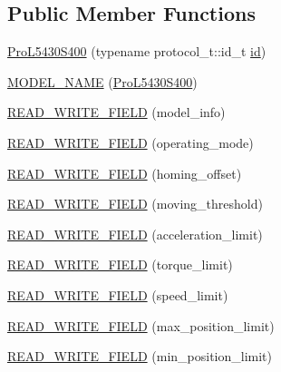 \subsection*{Public Member Functions}
\begin{DoxyCompactItemize}
\item 
\hyperlink{classdynamixel_1_1servos_1_1_pro_l5430_s400_af4b0f26432d0cff1da96587695f6f37b}{Pro\+L5430\+S400} (typename protocol\+\_\+t\+::id\+\_\+t \hyperlink{classdynamixel_1_1servos_1_1_servo_a2d022081672e25a7bb57b76706e1cc57}{id})
\item 
\hyperlink{classdynamixel_1_1servos_1_1_pro_l5430_s400_ad33f5bc07548ce765acddfe12567bfa4}{M\+O\+D\+E\+L\+\_\+\+N\+A\+M\+E} (\hyperlink{classdynamixel_1_1servos_1_1_pro_l5430_s400}{Pro\+L5430\+S400})
\item 
\hyperlink{classdynamixel_1_1servos_1_1_pro_l5430_s400_a548d8b215279c3f45d637e178388aa8a}{R\+E\+A\+D\+\_\+\+W\+R\+I\+T\+E\+\_\+\+F\+I\+E\+L\+D} (model\+\_\+info)
\item 
\hyperlink{classdynamixel_1_1servos_1_1_pro_l5430_s400_a43c7426506ee4c5953f2beebd71f8877}{R\+E\+A\+D\+\_\+\+W\+R\+I\+T\+E\+\_\+\+F\+I\+E\+L\+D} (operating\+\_\+mode)
\item 
\hyperlink{classdynamixel_1_1servos_1_1_pro_l5430_s400_a37dcd01bb0fb5f5f68c100892dc86751}{R\+E\+A\+D\+\_\+\+W\+R\+I\+T\+E\+\_\+\+F\+I\+E\+L\+D} (homing\+\_\+offset)
\item 
\hyperlink{classdynamixel_1_1servos_1_1_pro_l5430_s400_a4ac72ffe983f53ee57a4778686932566}{R\+E\+A\+D\+\_\+\+W\+R\+I\+T\+E\+\_\+\+F\+I\+E\+L\+D} (moving\+\_\+threshold)
\item 
\hyperlink{classdynamixel_1_1servos_1_1_pro_l5430_s400_a7efa895b5f29f0943ab8cec53aebe992}{R\+E\+A\+D\+\_\+\+W\+R\+I\+T\+E\+\_\+\+F\+I\+E\+L\+D} (acceleration\+\_\+limit)
\item 
\hyperlink{classdynamixel_1_1servos_1_1_pro_l5430_s400_a41c945d33bb564026ef5471b783863f6}{R\+E\+A\+D\+\_\+\+W\+R\+I\+T\+E\+\_\+\+F\+I\+E\+L\+D} (torque\+\_\+limit)
\item 
\hyperlink{classdynamixel_1_1servos_1_1_pro_l5430_s400_ab057769ab4bba3d2c6ed8643e6bcd2ef}{R\+E\+A\+D\+\_\+\+W\+R\+I\+T\+E\+\_\+\+F\+I\+E\+L\+D} (speed\+\_\+limit)
\item 
\hyperlink{classdynamixel_1_1servos_1_1_pro_l5430_s400_a00408bf0f23a06b6a27e878aa99bf361}{R\+E\+A\+D\+\_\+\+W\+R\+I\+T\+E\+\_\+\+F\+I\+E\+L\+D} (max\+\_\+position\+\_\+limit)
\item 
\hyperlink{classdynamixel_1_1servos_1_1_pro_l5430_s400_ac867075df246bf7812210f03a0da5681}{R\+E\+A\+D\+\_\+\+W\+R\+I\+T\+E\+\_\+\+F\+I\+E\+L\+D} (min\+\_\+position\+\_\+limit)

\end{DoxyCompactItemize}
